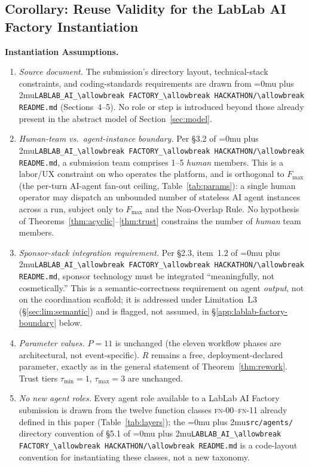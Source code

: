 \documentclass[12pt]{article}
\theoremstyle{definition}
\DeclareRobustCommand{\code}[1]{\begingroup\Urlmuskip=0mu plus 2mu\relax\nolinkurl{#1}\endgroup}
\newcommand{\FN}[1]{\textsc{fn-#1}}
\newcommand{\LabLabFactoryReadme}{\code{LABLAB\_AI\_\allowbreak FACTORY\_\allowbreak HACKATHON/\allowbreak README.md}}
\begin{document}
\subsection{Corollary: Reuse Validity for the LabLab AI Factory Instantiation}
\label{app:lablab-factory-reuse}

\noindent\textbf{Instantiation Assumptions.}
\begin{enumerate}
    \item[B1] \emph{Source document.}  The submission's directory
              layout, technical-stack constraints, and coding-standards
              requirements are drawn from \LabLabFactoryReadme{}
              (Sections~4--5).  No role or step is introduced beyond
              those already present in the abstract model of
              Section~\ref{sec:model}.
    \item[B2] \emph{Human-team vs.\ agent-instance boundary.}  Per
              \S3.2 of \LabLabFactoryReadme{}, a submission team
              comprises 1--5 \emph{human} members.  This is a
              labor/UX constraint on who operates the platform, and is
              orthogonal to $F_{\max}$ (the per-turn AI-agent fan-out
              ceiling, Table~\ref{tab:params}): a single human operator
              may dispatch an unbounded number of stateless AI agent
              instances across a run, subject only to $F_{\max}$ and
              the Non-Overlap Rule.  No hypothesis of
              Theorems~\ref{thm:acyclic}--\ref{thm:trust} constrains
              the number of \emph{human} team members.
    \item[B3] \emph{Sponsor-stack integration requirement.}  Per
              \S2.3, item~1.2 of \LabLabFactoryReadme{}, sponsor
              technology must be integrated ``meaningfully, not
              cosmetically.''  This is a semantic-correctness
              requirement on agent \emph{output}, not on the
              coordination scaffold; it is addressed under
              Limitation~L3 (\S\ref{sec:lim:semantic}) and is flagged,
              not assumed, in \S\ref{app:lablab-factory-boundary} below.
    \item[B4] \emph{Parameter values.}  $P = 11$ is unchanged (the
              eleven workflow phases are architectural, not
              event-specific).  $R$ remains a free, deployment-declared
              parameter, exactly as in the general statement of
              Theorem~\ref{thm:rework}.  Trust tiers $\tau_{\min}=1$,
              $\tau_{\max}=3$ are unchanged.
    \item[B5] \emph{No new agent roles.}  Every agent role available to
              a LabLab AI Factory submission is drawn from the twelve
              function classes \FN{00}--\FN{11} already defined in this
              paper (Table~\ref{tab:layers}); the \code{src/agents/}
              directory convention of \S5.1 of \LabLabFactoryReadme{}
              is a code-layout convention for instantiating these
              classes, not a new taxonomy.
\end{enumerate}
\end{document}
